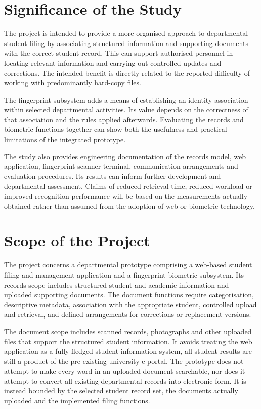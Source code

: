 \section{Significance of the Study}\label{sec:1-5}

The project is intended to provide a more organised approach to departmental student filing by associating structured information and supporting documents with the correct student record. This can support authorised personnel in locating relevant information and carrying out controlled updates and corrections. The intended benefit is directly related to the reported difficulty of working with predominantly hard-copy files.

The fingerprint subsystem adds a means of establishing an identity association within selected departmental activities. Its value depends on the correctness of that association and the rules applied afterwards. Evaluating the records and biometric functions together can show both the usefulness and practical limitations of the integrated prototype.

The study also provides engineering documentation of the records model, web application, fingerprint scanner terminal, communication arrangements and evaluation procedures. Its results can inform further development and departmental assessment. Claims of reduced retrieval time, reduced workload or improved recognition performance will be based on the measurements actually obtained rather than assumed from the adoption of web or biometric technology.

\section{Scope of the Project}\label{sec:1-6}

The project concerns a departmental prototype comprising a web-based student filing and management application and a fingerprint biometric subsystem. Its records scope includes structured student and academic information and uploaded supporting documents. The document functions require categorisation, descriptive metadata, association with the appropriate student, controlled upload and retrieval, and defined arrangements for corrections or replacement versions.

The document scope includes scanned records, photographs and other uploaded files that support the structured student information. It avoids treating the web application as a fully fledged student information system, all student results are still a product of the pre-existing university e-portal. The prototype does not attempt to make every word in an uploaded document searchable, nor does it attempt to convert all existing departmental records into electronic form. It is instead bounded by the selected student record set, the documents actually uploaded and the implemented filing functions.

